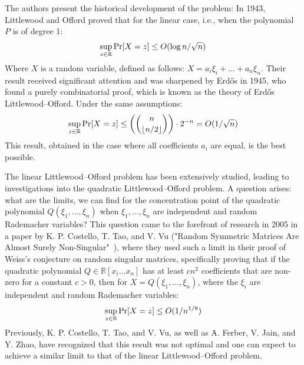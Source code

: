 The authors present the historical development of the problem:
\newline
In 1943, Littlewood and Offord proved that for the linear case, i.e., when the polynomial $P$ is of degree 1:
\vspace{-0.4\baselineskip}
\[ \sup_{z\in\mathbb{R}} \Pr[X=z] \leq O(\log n/\sqrt{n}) \vspace{-0.8\baselineskip} \]
\newline
Where $X$ is a random variable, defined as follows: $X = a_i \xi_i + \ldots + a_n \xi_n$.
\newline
Their result received significant attention and was sharpened by Erdős in 1945, who found a purely combinatorial proof, which is known as the theory of Erdős Littlewood–Offord. Under the same assumptions:
\vspace{-0.2\baselineskip}
\[ \sup_{z\in\mathbb{R}} \Pr[X=z] \leq \left( n \choose \lfloor n/2 \rfloor \right) \cdot 2^{-n} = O(1/\sqrt{n}) \vspace{-0.5\baselineskip} \]
\newline
This result, obtained in the case where all coefficients $a_i$ are equal, is the best possible.
 
The linear Littlewood–Offord problem has been extensively studied, leading to investigations into the quadratic Littlewood–Offord problem. A question arises: what are the limits, we can find for the concentration point of the quadratic polynomial $Q(\xi_1,\ldots,\xi_n)$ when $\xi_1,\ldots,\xi_n$ are independent and random Rademacher variables? This question came to the forefront of research in 2005 in a paper by K. P. Costello, T. Tao, and V. Vu ("Random Symmetric Matrices Are Almost Surely Non-Singular"~\cite{costello2005random}), where they used such a limit in their proof of Weiss's conjecture on random singular matrices, specifically proving that if the quadratic polynomial $Q \in \mathbb{R}[x_i \ldots x_n]$ has at least $cn^2$ coefficients that are non-zero for a constant $c > 0$, then for $X = Q(\xi_1,\ldots,\xi_n)$, where the $\xi_i$ are independent and random Rademacher variables:
\vspace{-0.24\baselineskip}
\[ \sup_{z\in\mathbb{R}} \Pr[X=z] \leq O(1/n^{1/8}) \vspace{-0.27\baselineskip} \]
Previously, K. P. Costello, T. Tao, and V. Vu, as well as A. Ferber, V. Jain, and Y. Zhao, have recognized that this result was not optimal and one can expect to achieve a similar limit to that of the linear Littlewood–Offord problem.
 
